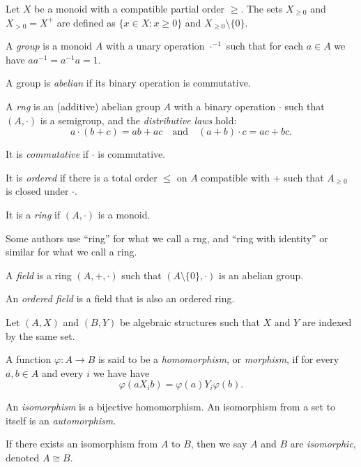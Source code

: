 \begin{defn}
    Let $X$ be a monoid with a compatible partial order $\ge$.
    The sets $X_{\ge 0}$ and $X_{>0}=X^+$ are defined as
    $\{x\in X:x\ge 0\}$ and $X_{\ge 0}\setminus\{0\}$.
\end{defn}
\begin{defn}
    A \emph{group} is a monoid $A$ with a unary operation $\cdot^{-1}$ such that
    for each $a\in A$ we have $aa^{-1}=a^{-1}a=1$.
    
    A group is \emph{abelian} if its binary operation is commutative.
\end{defn}
\begin{defn}
    A \emph{rng} is an (additive) abelian group $A$ with a binary operation
    $\cdot$ such that $(A,\cdot)$ is a semigroup, and the
    \emph{distributive laws} hold:
    \[a\cdot(b+c)=ab+ac\quad\text{and}\quad (a+b)\cdot c=ac+bc.\]

    It is \emph{commutative} if $\cdot$ is commutative.

    It is \emph{ordered} if there is a total order $\le$ on $A$ compatible with
    $+$ such that $A_{\ge 0}$ is closed under $\cdot$.

    It is a \emph{ring} if $(A,\cdot)$ is a monoid.
  \end{defn}
  \begin{rem}
      Some authors use ``ring'' for what we call a rng, and ``ring with
      identity'' or similar for what we call a ring.
  \end{rem}
  \begin{defn}
    A \emph{field} is a ring $(A,+,\cdot)$ such that $(A\setminus
    \{0\},\cdot)$ is an abelian group.

    An \emph{ordered field} is a field that is also an ordered ring.
  \end{defn}
  \begin{defn}
    Let $(A,X)$ and $(B,Y)$ be algebraic structures such that $X$ and $Y$ are
    indexed by the same set.

    A function $\varphi:A\to B$ is said
    to be a \emph{homomorphism}, or \emph{morphism}, if
    for every $a,b\in A$ and every $i$ we have
    have \[\varphi(a X_i b)=\varphi(a) Y_i \varphi(b).\]
\end{defn}
\begin{defn}
    An \emph{isomorphism} is a bijective homomorphism. An isomorphism from a set
    to itself is an \emph{automorphism}.

    If there exists an isomorphism from $A$ to $B$, then we say $A$ and $B$ are
    \emph{isomorphic}, denoted $A\cong B$.
  \end{defn}
